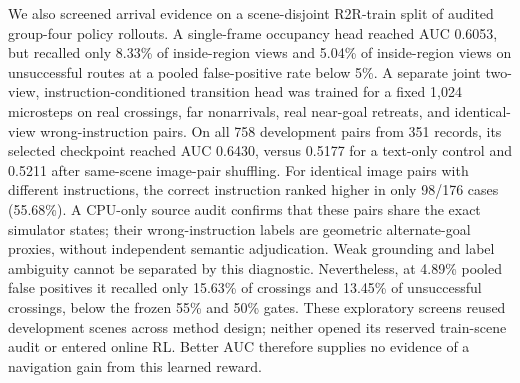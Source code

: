 \documentclass[10pt,twocolumn,letterpaper]{article}
\begin{document}
We also screened arrival evidence on a scene-disjoint R2R-train split
of audited group-four policy rollouts. A single-frame occupancy head
reached AUC 0.6053, but recalled only 8.33\% of inside-region views
and 5.04\% of inside-region views on unsuccessful routes at a pooled
false-positive rate below 5\%. A separate joint two-view, instruction-conditioned
transition head was trained for a fixed 1,024 microsteps on real
crossings, far nonarrivals, real near-goal retreats, and identical-view
wrong-instruction pairs. On all 758 development pairs from 351 records,
its selected checkpoint reached AUC 0.6430, versus 0.5177 for a
text-only control and 0.5211 after same-scene image-pair shuffling.
For identical image pairs with different instructions, the correct
instruction ranked higher in only 98/176 cases (55.68\%). A CPU-only
source audit confirms that these pairs share the exact simulator states;
their wrong-instruction labels are geometric alternate-goal proxies,
without independent semantic adjudication. Weak grounding and label
ambiguity cannot be separated by this diagnostic.
Nevertheless, at 4.89\% pooled false positives it recalled only
15.63\% of crossings and 13.45\% of unsuccessful crossings, below the
frozen 55\% and 50\% gates. These exploratory screens reused
development scenes across method design; neither opened its reserved
train-scene audit or entered online RL. Better AUC therefore supplies
no evidence of a navigation gain from this learned reward.
\end{document}
